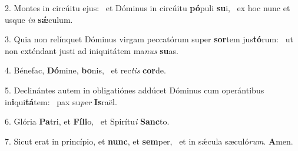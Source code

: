 2. Montes in circúitu ejus: \dag\  et Dóminus in circúitu \textbf{pó}puli \textbf{su}i, \ast\  ex hoc nunc et usque \textit{in} \textbf{sǽ}culum.\

3. Quia non relínquet Dóminus virgam peccatórum super \textbf{sor}tem jus\textbf{tó}rum: \ast\  ut non exténdant justi ad iniquitátem ma\textit{nus} \textbf{su}as.\

4. Bénefac, \textbf{Dó}mine, \textbf{bo}nis, \ast\  et rec\textit{tis} \textbf{cor}de.\

5. Declinántes autem in obligatiónes addúcet Dóminus cum operántibus in\textbf{i}qui\textbf{tá}tem: \ast\  pax su\textit{per} \textbf{Is}raël.\

6. Glória \textbf{Pa}tri, et \textbf{Fí}\textbf{li}o, \ast\  et Spirítu\textit{i} \textbf{Sanc}to.\

7. Sicut erat in princípio, et \textbf{nunc}, et \textbf{sem}per, \ast\  et in sǽcula sæculó\textit{rum}. \textbf{A}men.\

